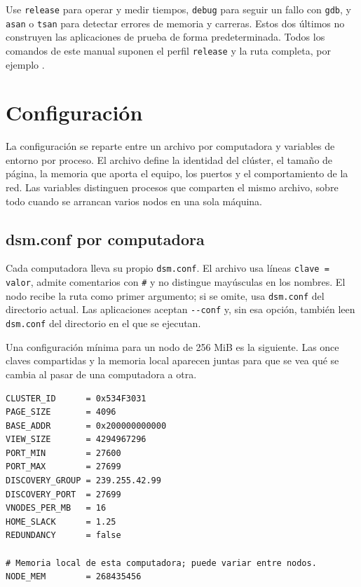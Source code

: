 Use \texttt{release} para operar y medir tiempos, \texttt{debug} para seguir un fallo con \texttt{gdb}, y \texttt{asan} o \texttt{tsan} para detectar errores de memoria y carreras. Estos dos últimos no construyen las aplicaciones de prueba de forma predeterminada. Todos los comandos de este manual suponen el perfil \texttt{release} y la ruta completa, por ejemplo .

\section{Configuración}\label{sec:configuracion}

La configuración se reparte entre un archivo por computadora y variables de entorno por proceso. El archivo define la identidad del clúster, el tamaño de página, la memoria que aporta el equipo, los puertos y el comportamiento de la red. Las variables distinguen procesos que comparten el mismo archivo, sobre todo cuando se arrancan varios nodos en una sola máquina.

\subsection{dsm.conf por computadora}\label{subsec:conf-por-pc}

Cada computadora lleva su propio \texttt{dsm.conf}. El archivo usa líneas \texttt{clave = valor}, admite comentarios con \texttt{\#} y no distingue mayúsculas en los nombres. El nodo recibe la ruta como primer argumento; si se omite, usa \texttt{dsm.conf} del directorio actual. Las aplicaciones aceptan \texttt{-{}-conf} y, sin esa opción, también leen \texttt{dsm.conf} del directorio en el que se ejecutan.

Una configuración mínima para un nodo de 256 MiB es la siguiente. Las once claves compartidas y la memoria local aparecen juntas para que se vea qué se cambia al pasar de una computadora a otra.

\begin{lstlisting}
CLUSTER_ID      = 0x534F3031
PAGE_SIZE       = 4096
BASE_ADDR       = 0x200000000000
VIEW_SIZE       = 4294967296
PORT_MIN        = 27600
PORT_MAX        = 27699
DISCOVERY_GROUP = 239.255.42.99
DISCOVERY_PORT  = 27699
VNODES_PER_MB   = 16
HOME_SLACK      = 1.25
REDUNDANCY      = false

# Memoria local de esta computadora; puede variar entre nodos.
NODE_MEM        = 268435456
\end{lstlisting}

